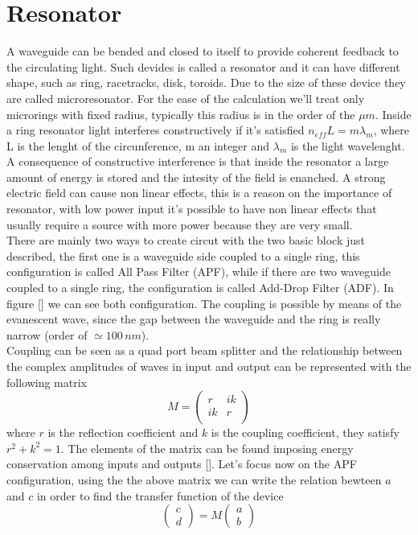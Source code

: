 \documentclass[12pt]{book}
\begin{document}
\section{Resonator}
A waveguide can be bended and closed to itself to provide coherent feedback to the circulating light. Such devides is called a resonator and it can have different shape, such as ring, racetracks, disk, toroids. Due to the size of these device they are called microresonator. For the ease of the calculation we'll treat only microrings with fixed radius, typically this radius is in the order of the $\mu m $. Inside a ring resonator light interferes constructively if it's satisfied $n_{eff} L = m \lambda_m$, where L is the lenght of the circunference, m an integer and $\lambda_m$ is the light wavelenght. A consequence of constructive interference is that inside the resonator a large amount of energy is stored and the intesity of the field is enanched. A strong electric field can cause non linear effects, this is a reason on the importance of resonator, with low power input it's possible to have non linear effects that usually require a source with more power because they are very small. \\
There are mainly two ways to create circut with the two basic block just described, the first one is a waveguide side coupled to a single ring, this configuration is called All Pass Filter (APF), while if there are two waveguide coupled to a single ring, the configuration is called Add-Drop Filter (ADF). In figure [] we can see both configuration. The coupling is possible by means of the evanescent wave, since the gap between the waveguide and the ring is really narrow (order of $\simeq 100\, nm$).\\
Coupling can be seen as a quad port beam splitter and the relationship between the complex amplitudes of waves in input and output can be represented with the following matrix
\[M = \begin{pmatrix}
r & ik \\
ik & r\\
\end{pmatrix}\]
where $r$ is the reflection coefficient and $k$ is the coupling coefficient, they satisfy $r^2 +k^2 = 1$. The elements of the matrix can be found imposing energy conservation among inputs and outputs []. Let's focus now on the APF configuration, using the the above matrix we can write the relation bewteen $a$ and $c$ in order to find the transfer function of the device
\begin{equation}\label{APF}\begin{pmatrix}c \\ d \end{pmatrix} = M \begin{pmatrix}a\\b \end{pmatrix}\end{equation}
\end{document}
